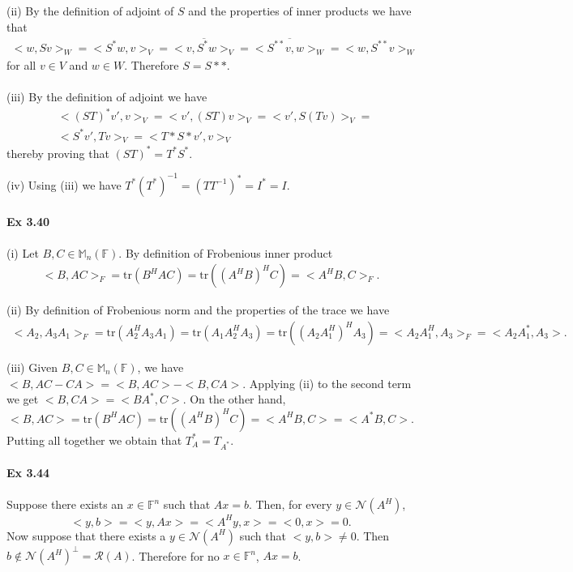 \documentclass[letterpaper,12pt]{article}
\theoremstyle{definition}
\begin{document}
\begin{spacing}{1.3}{}
	(ii)
	By the definition of adjoint of $S$ and the properties of inner products we have that
	\begin{align*}
	<w,Sv>_W=<S^*w,v>_V  =
	\overline{<v,S^*w>_V}  =\overline{<S^{**}v,w>_W}  =
	<w,S^{**}v>_W
	\end{align*}
	for all $v\in V$ and $w\in W$.
	Therefore $S=S**$. \\\\
	
	(iii)
	By the definition of adjoint we have
	\begin{align*}
	&<(ST)^*v',v>_V  =<v',(ST)v>_V  =<v',S(Tv)>_V  =\\
	&<S^*v',Tv>_V  =<T*S*v',v>_V
	\end{align*}
	thereby proving that $(ST)^*=T^*S^*$.
	
	(iv)
	Using (iii) we have $T^*(T^*)^{-1}  =  (TT^{-1})^*=I^*=I$. \\\\
	
	\textbf{Ex 3.40} \\\\
	(i)
	Let $B,C\in\mathbb M_n(\mathbb F)$.
	By definition of Frobenious inner product
	\begin{align*}
	<B,AC>_F=\text{tr}(B^HAC)=\text{tr}((A^HB)^HC)=<A^HB,C>_F.
	\end{align*}
	
	(ii)
	By definition of Frobenious norm and the properties of the trace we have
	\begin{align*}
	<A_2,A_3A_1>_F=\text{tr}(A_2^HA_3A_1)=
	\text{tr}(A_1A_2^HA_3)=\text{tr}((A_2A_1^H)^HA_3)=
	<A_2A_1^H,A_3>_F=<A_2A_1^*,A_3>.
	\end{align*}
	
	(iii)
	Given $B,C\in\mathbb M_n(\mathbb F)$, we have $<B,AC-CA>=<B,AC>-<B,CA>$.
	Applying (ii) to the second term we get $<B,CA>=<BA^*,C>$.
	On the other hand,
	\begin{equation*}
	<B,AC>=\text{tr}(B^HAC)=\text{tr}((A^HB)^HC)=<A^HB,C>=<A^*B,C>.
	\end{equation*}
	Putting all together we obtain that $T_A^*=T_{A^*}$. \\\\
	
	\textbf{Ex 3.44} \\\\
	Suppose there exists an $x\in\mathbb F^n$ such that $Ax=b$.
	Then, for every $y\in\mathcal N(A^H)$,
	$$<y,b>=<y,Ax>=<A^Hy,x>=<0,x>=0.$$
	Now suppose that there exists a $y\in\mathcal N(A^H)$ such that $<y,b>\neq0$.
	Then $b\notin\mathcal N(A^H)^\perp=\mathcal R(A)$.
	Therefore for no $x\in\mathbb F^n$, $Ax=b$. \\\\
	

\end{spacing}
\end{document}

